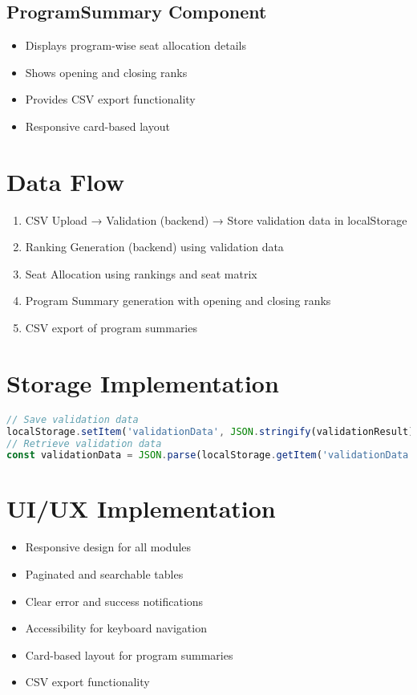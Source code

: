 \documentclass[12pt,a4paper]{article}
\begin{document}
\subsection{ProgramSummary Component}
\begin{itemize}
    \item Displays program-wise seat allocation details
    \item Shows opening and closing ranks
    \item Provides CSV export functionality
    \item Responsive card-based layout
\end{itemize}

\section{Data Flow}
\begin{enumerate}
    \item CSV Upload → Validation (backend) → Store validation data in localStorage
    \item Ranking Generation (backend) using validation data
    \item Seat Allocation using rankings and seat matrix
    \item Program Summary generation with opening and closing ranks
    \item CSV export of program summaries
\end{enumerate}

\section{Storage Implementation}
\begin{lstlisting}[language=JavaScript]
// Save validation data
localStorage.setItem('validationData', JSON.stringify(validationResult));
// Retrieve validation data
const validationData = JSON.parse(localStorage.getItem('validationData'));
\end{lstlisting}

\section{UI/UX Implementation}
\begin{itemize}
    \item Responsive design for all modules
    \item Paginated and searchable tables
    \item Clear error and success notifications
    \item Accessibility for keyboard navigation
    \item Card-based layout for program summaries
    \item CSV export functionality
\end{itemize}
\end{document}
